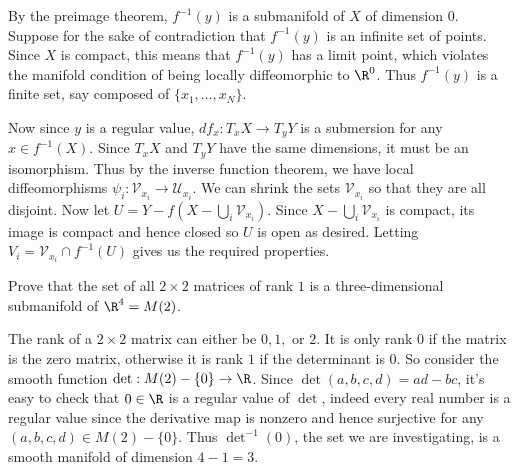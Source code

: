\documentclass[11pt,letterpaper]{article}
\begin{document}
\begin{solution}
    \quad By the preimage theorem, $f^{-1}(y)$ is a submanifold of $X$ of dimension $0$. Suppose for the sake of contradiction that $f^{-1}(y)$ is an infinite set of points. Since $X$ is compact, this means that $f^{-1}(y)$ has a limit point, which violates the manifold condition of being locally diffeomorphic to $\R^0$. Thus $f^{-1}(y)$ is a finite set, say composed of $\{x_1, \ldots, x_N\}$.

    \quad Now since $y$ is a regular value, $df_x : T_xX \to T_yY$ is a submersion for any $x\in f^{-1}(X)$. Since $T_xX$ and $T_yY$ have the same dimensions, it must be an isomorphism. Thus by the inverse function theorem, we have local diffeomorphisms $\psi_i : \mathcal{V}_{x_i} \to \mathcal{U}_{x_i}$. We can shrink the sets $\mathcal{V}_{x_i}$ so that they are all disjoint. Now let $U=Y-f(X-\bigcup_i \mathcal{V}_{x_i})$. Since $X-\bigcup_i \mathcal{V}_{x_i}$ is compact, its image is compact and hence closed so $U$ is open as desired. Letting $V_i = \mathcal{V}_{x_i} \cap f^{-1}(U)$ gives us the required properties.  
\end{solution}

\begin{problem}
    Prove that the set of all $2\times 2$ matrices of rank $1$ is a three-dimensional submanifold of $\R^4=M(2)$. %
\end{problem}

\quad The rank of a $2\times 2$ matrix can either be $0,1,$ or $2$. It is only rank $0$ if the matrix is the zero matrix, otherwise it is rank $1$ if the determinant is $0$. So consider the smooth function $\det : M(2)-\{0\} \to \R$. Since $\det(a,b,c,d)=ad-bc$, it's easy to check that $0\in \R$ is a regular value of $\det$, indeed every real number is a regular value since the derivative map is nonzero and hence surjective for any $(a,b,c,d)\in M(2)-\{0\}$. Thus $\det^{-1}(0)$, the set we are investigating, is a smooth manifold of dimension $4-1=3$.
\end{document}
